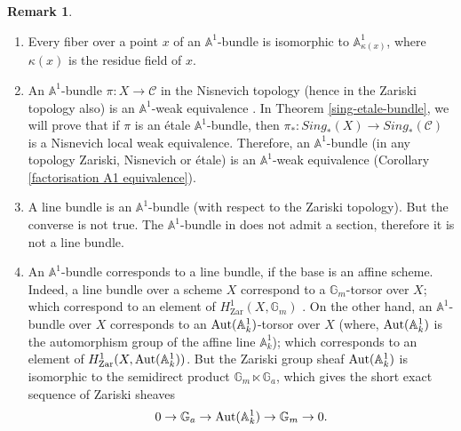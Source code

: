 \documentclass[11pt, reqno]{amsart}
\theoremstyle{plain}
\theoremstyle{definition}
\newtheorem{remark}[thm]{Remark}
\newcommand{\Aut}{{\rm Aut}}
\newcommand{\sC}{{\mathcal C}}
\newcommand{\A}{{\mathbb A}}
\begin{document}
	\begin{remark} \label{a1 bundle properties}
	    \begin{enumerate}
	    
          \item Every fiber over a point $x$ of an $\mathbb{A}^1$-bundle is isomorphic to $\mathbb{A}^1_{\kappa(x)}$, where $\kappa(x)$ is the residue field of $x$. 
\item An $\A^1$-bundle $\pi: X \to \sC$ in the Nisnevich topology (hence in the Zariski topology also) is an $\A^1$-weak equivalence \cite[Section 3.1, Example 2.3]{mv}. In Theorem \ref{sing-etale-bundle}, we will prove that if $\pi$ is an \'etale $\A^1$-bundle, then $\pi_*: Sing_*(X) \to Sing_*(\sC)$ is a Nisnevich local weak equivalence. Therefore, an $\A^1$-bundle (in any topology Zariski, Nisnevich or \'etale) is an $\A^1$-weak equivalence (Corollary \ref{factorisation A1 equivalence}).
	        \item A line bundle is an $\mathbb{A}^1$-bundle (with respect to the Zariski topology). But the converse is not true. The $\A^1$-bundle in \cite[Example 2]{doub} does not admit a section, therefore it is not a line bundle.
            \item An $\mathbb{A}^1$-bundle corresponds to a line bundle, if the base is an affine scheme. Indeed, a line bundle over a scheme $X$ correspond to a $\mathbb{G}_m$-torsor over $X$; which correspond to an element of $H^1_{\text{Zar}}(X, \mathbb{G}_m)$ \cite[Corollary 4.7]{milne}. On the other hand, an $\mathbb{A}^1$-bundle over $X$ corresponds to an $\Aut(\A^1_k)$-torsor over $X$ (where, $\Aut(\A^1_k)$ is the automorphism group of the affine line $\A^1_k$); which corresponds to an element of $H^1_{\text{Zar}}(X, \Aut(\A^1_k))$. But the Zariski group sheaf $\Aut(\A^1_k)$ is isomorphic to the semidirect product
            $\mathbb{G}_m \ltimes \mathbb{G}_a$, which gives the short exact sequence of Zariski sheaves 
		$$0 \rightarrow \mathbb{G}_a \rightarrow \Aut(\A^1_k) \rightarrow \mathbb{G}_m \rightarrow 0.$$

\end{enumerate}
\end{remark}
\end{document}
